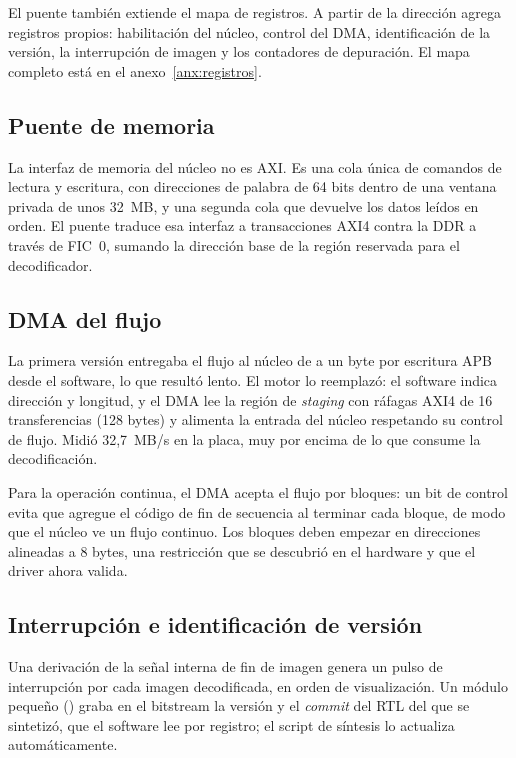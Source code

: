 El puente también extiende el mapa de registros. A partir de la dirección
 agrega registros propios: habilitación del núcleo, control del
DMA, identificación de la versión, la interrupción de imagen y los contadores
de depuración. El mapa completo está en el anexo~\ref{anx:registros}.

\subsection{Puente de memoria}

La interfaz de memoria del núcleo no es AXI. Es una cola única de comandos de
lectura y escritura, con direcciones de palabra de 64 bits dentro de una
ventana privada de unos 32~MB, y una segunda cola que devuelve los datos
leídos en orden. El puente  traduce esa interfaz a
transacciones AXI4 contra la DDR a través de FIC~0, sumando la dirección
base de la región reservada para el decodificador.

\subsection{DMA del flujo}

La primera versión entregaba el flujo al núcleo de a un byte por escritura
APB desde el software, lo que resultó lento. El motor
 lo reemplazó: el software indica dirección y longitud, y
el DMA lee la región de \emph{staging} con ráfagas AXI4 de 16 transferencias
(128 bytes) y alimenta la entrada del núcleo respetando su control de flujo.
Midió 32,7~MB/s en la placa, muy por encima de lo que consume la
decodificación.

Para la operación continua, el DMA acepta el flujo por bloques: un bit de
control evita que agregue el código de fin de secuencia al terminar cada
bloque, de modo que el núcleo ve un flujo continuo. Los bloques deben
empezar en direcciones alineadas a 8 bytes, una restricción que se descubrió
en el hardware y que el driver ahora valida.

\subsection{Interrupción e identificación de versión}

Una derivación de la señal interna de fin de imagen genera un pulso de
interrupción por cada imagen decodificada, en orden de visualización. Un
módulo pequeño () graba en el bitstream la versión y el
\emph{commit} del RTL del que se sintetizó, que el software lee por registro;
el script de síntesis lo actualiza automáticamente.

